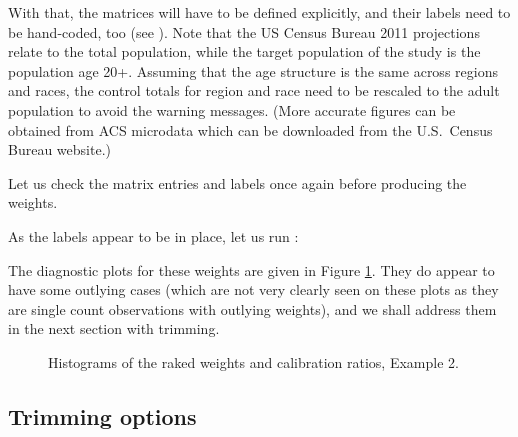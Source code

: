 \begin{stexample}[Example 2]
\begin{stlog}
\nullskip
\end{stlog}

With that, the matrices will have to be defined explicitly,
and their labels need to be hand-coded, too (see ).
Note that the US Census Bureau 2011
projections relate to the total population, while the target population
of the study is the population age 20+. Assuming that the age structure
is the same across regions and races, the control totals for region and race
need to be rescaled to the adult population to avoid the warning messages.
(More accurate figures can be obtained from ACS microdata which can be downloaded
from the U.S.\ Census Bureau website.)

\begin{stlog}
\nullskip
\end{stlog}

Let us check the matrix entries and labels once again before
producing the weights.

\begin{stlog}
\nullskip
\end{stlog}

As the labels appear to be in place, let us run :

\begin{stlog}
\nullskip
\end{stlog}

The diagnostic plots for these weights are given in Figure \ref{fig:example2}.
They do appear to have some outlying cases (which are not very clearly seen
on these plots as they are single count observations with outlying weights),
and we shall address them in the next section with trimming.

\begin{figure}[h!]
\begin{center}
\end{center}
\caption{Histograms of the raked weights and calibration ratios, Example 2.}
\label{fig:example2}
\end{figure}

\end{stexample}

\subsection{Trimming options}
\label{subsec:example:trimming}


